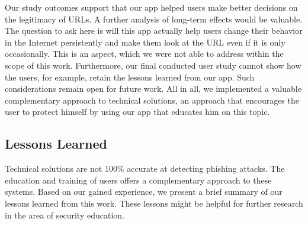 Our study outcomes support that our app helped users make better decisions on the legitimacy of URLs.
A further analysis of long-term effects would be valuable. The question to ask here is will this app actually help users change their behavior in the Internet persistently and make them look at the URL even if it is only occasionally. This is an aspect, which we were not able to address within the scope of this work. 
Furthermore, our final conducted user study cannot show how the users, for example, retain the lessons learned from our app. Such considerations remain open for future work.
All in all, we implemented a valuable complementary approach to technical solutions, an approach that encourages the user to protect himself by using our app that educates him on this topic.

\subsection{Lessons Learned}
Technical solutions are not 100\% accurate at detecting phishing attacks.
The education and training of users offers a complementary approach to these systems.
Based on our gained experience, we present a brief summary of our lessons learned from this work.
These lessons might be helpful for further research in the area of security education.

